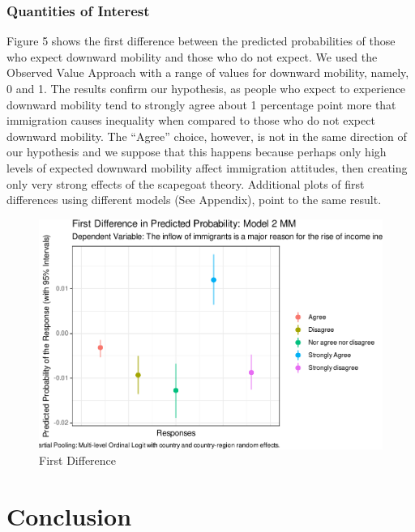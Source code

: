 \documentclass[
  11pt,
]{article}
\begin{document}
\hypertarget{quantities-of-interest}{%
\subsubsection{Quantities of Interest}\label{quantities-of-interest}}

Figure 5 shows the first difference between the predicted probabilities
of those who expect downward mobility and those who do not expect. We
used the Observed Value Approach with a range of values for downward
mobility, namely, 0 and 1. The results confirm our hypothesis, as people
who expect to experience downward mobility tend to strongly agree about
1 percentage point more that immigration causes inequality when compared
to those who do not expect downward mobility. The ``Agree'' choice,
however, is not in the same direction of our hypothesis and we suppose
that this happens because perhaps only high levels of expected downward
mobility affect immigration attitudes, then creating only very strong
effects of the scapegoat theory. Additional plots of first differences
using different models (See Appendix), point to the same result.

\vspace{0.4cm}

\begin{figure}
\centering
\includegraphics{AQM-paper_files/figure-latex/plotFD-1.pdf}
\caption{First Difference}
\end{figure}

\vspace{0.4cm}

\hypertarget{conclusion}{%
\section{Conclusion}\label{conclusion}}
\end{document}

